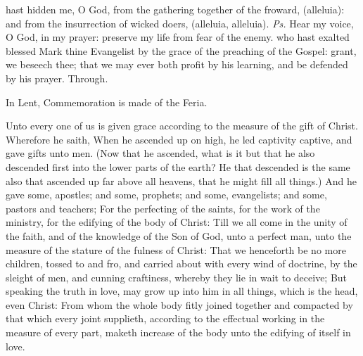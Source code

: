 \introit
{} hast hidden me, O God, from the gathering together of the froward, (alleluia): and from the insurrection of wicked doers, (alleluia, alleluia). \textit{Ps.} Hear my voice, O God, in my prayer: preserve my life from fear of the enemy.
\collect
 who hast exalted blessed Mark thine Evangelist by the grace of the preaching of the Gospel: grant, we beseech thee; that we may ever both profit by his learning, and be defended by his prayer. Through.
\begin{rubric}
    In Lent, Commemoration is made of the Feria.%
\end{rubric}
\vspace{-1ex}
 Unto every one of us is given grace according to the measure of the gift of Christ. Wherefore he saith, When he ascended up on high, he led captivity captive, and gave gifts unto men. (Now that he ascended, what is it but that he also descended first into the lower parts of the earth? He that descended is the same also that ascended up far above all heavens, that he might fill all things.) And he gave some, apostles; and some, prophets; and some, evangelists; and some, pastors and teachers; For the perfecting of the saints, for the work of the ministry, for the edifying of the body of Christ: Till we all come in the unity of the faith, and of the knowledge of the Son of God, unto a perfect man, unto the measure of the stature of the fulness of Christ: That we henceforth be no more children, tossed to and fro, and carried about with every wind of doctrine, by the sleight of men, and cunning craftiness, whereby they lie in wait to deceive; But speaking the truth in love, may grow up into him in all things, which is the head, even Christ: From whom the whole body fitly joined together and compacted by that which every joint supplieth, according to the effectual working in the measure of every part, maketh increase of the body unto the edifying of itself in love.

